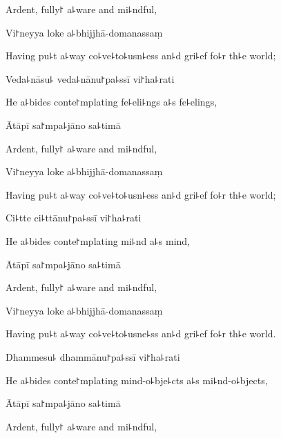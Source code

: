 \begin{english}
  Ardent, fully꜓ a꜕ware and mi꜕ndful,
\end{english}

Vi꜓neyya loke a꜕bhijjhā-domanassaṃ

\begin{english}
  Having pu꜕t a꜕way co꜕ve꜕to꜕usn꜕ess an꜕d gri꜕ef fo꜕r th꜕e world;
\end{english}

Veda꜕nāsu꜕ veda꜕nānu꜓pa꜕ssī vi꜓ha꜕rati

\begin{english}
  He a꜕bides conte꜓mplating fe꜕eli꜕ngs a꜕s fe꜕elings,
\end{english}

Ātāpī sa꜓mpa꜕jāno sa꜕timā

\begin{english}
  Ardent, fully꜓ a꜕ware and mi꜕ndful,
\end{english}

Vi꜓neyya loke a꜕bhijjhā-domanassaṃ

\begin{english}
  Having pu꜕t a꜕way co꜕ve꜕to꜕usn꜕ess an꜕d gri꜕ef fo꜕r th꜕e world;
\end{english}

Ci꜕tte ci꜕ttānu꜓pa꜕ssī vi꜓ha꜕rati

\begin{english}
  He a꜕bides conte꜓mplating mi꜕nd a꜕s mind,
\end{english}

Ātāpī sa꜓mpa꜕jāno sa꜕timā

\begin{english}
  Ardent, fully꜓ a꜕ware and mi꜕ndful,
\end{english}

Vi꜓neyya loke a꜕bhijjhā-domanassaṃ

\begin{english}
  Having pu꜕t a꜕way co꜕ve꜕to꜕usne꜕ss an꜕d gri꜕ef fo꜕r th꜕e world.
\end{english}

Dhammesu꜕ dhammānu꜓pa꜕ssī vi꜓ha꜕rati

\begin{english}
  He a꜕bides conte꜓mplating mind-o꜕bje꜕cts a꜕s mi꜕nd-o꜕bjects,
\end{english}

Ātāpī sa꜓mpa꜕jāno sa꜕timā

\begin{english}
  Ardent, fully꜓ a꜕ware and mi꜕ndful,
\end{english}

